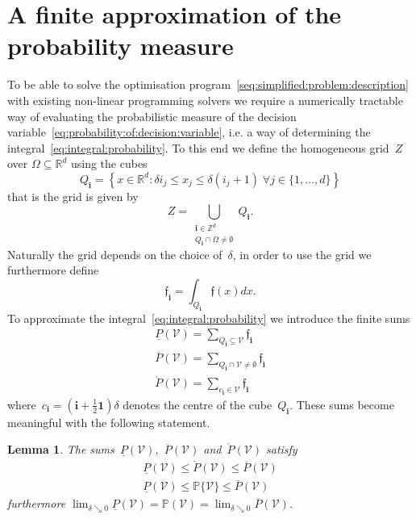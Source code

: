 \documentclass[letterpaper, 10pt, conference]{ieeeconf} %
\newtheorem{thm}{Lemma}[section]
\providecommand{\bfa}[1]{\mathbf{#1}}
\begin{document}
\section{A finite approximation of the probability measure}\label{sec:counting:cubes}
%
%
%
%
\noindent To be able to solve the optimisation program~\eqref{seq:simplified:problem:description} with existing non-linear programming solvers we require a numerically tractable way of evaluating the probabilistic measure of the decision variable~\eqref{eq:probability:of:decision:variable}, i.e. a way of determining the integral~\eqref{eq:integral:probability}.
%
To this end we define the homogeneous grid~$Z$ over $\Omega\subseteq\mathbb R^d$ using the cubes
%
\begin{equation}
	Q_{\bfa{i}} =\left\{x\in\mathbb R^d: \delta i_j \leq x_j\leq\delta (i_j+1)\;\forall j\in\{1,\dots,d\} \right\}
\end{equation}
%
that is the grid is given by
%
\begin{equation}
	Z = \bigcup_{\substack{\bfa{i}\in\mathbb Z^d\\ Q_\bfa{i}\cap\Omega\neq\emptyset}} Q_\bfa{i}.
\end{equation}
%
Naturally the grid depends on the choice of~$\delta$, in order to use the grid we furthermore define
%
\begin{equation}
	\mathfrak f_\bfa{i} = \int_{Q_\bfa{i}}\mathfrak f(x)dx.
\end{equation}
%
To approximate the integral~\eqref{eq:integral:probability} we introduce the finite sums
%
\begin{align}
\underline{P}(\mathcal V) = \sum_{Q_\bfa{i}\subseteq\mathcal V}\mathfrak f_\bfa{i}\label{eq:inner:approx}\\
\overline{P}(\mathcal V) = \sum_{Q_\bfa{i}\cap\mathcal V\neq\emptyset}\mathfrak f_\bfa{i} \label{eq:outer:approx}\\
\mathring{P}(\mathcal V) = \sum_{c_\bfa{i}\in\mathcal V}\mathfrak f_\bfa{i}\label{eq:center:approx}
\end{align}
%
where~$c_\bfa{i}=(\bfa{i}+\frac{1}{2}\bfa{1})\delta$ denotes the centre of the cube~$Q_\bfa{i}$.
%
These sums become meaningful with the following statement.
%
\begin{thm}\label{thm:sandwich:inequality}
The sums~$\underline P(\mathcal V)$,~$\overline{P}(\mathcal V)$ and~$\mathring{P}(\mathcal V)$ satisfy
%
\begin{align}
\underline{P}(\mathcal V)\leq \mathring{P}(\mathcal V)\leq\overline{P}(\mathcal V)\label{eq:sandwich:synthetical}\\
\underline{P}(\mathcal V)\leq \mathbb P\{\mathcal V\}\leq\overline{P}(\mathcal V)\label{eq:sandwich:analytical}
\end{align}
%
furthermore $\lim_{\delta\searrow0}\underline{P}(\mathcal V)=\mathbb{P}(\mathcal V)=\lim_{\delta\searrow0}\overline{P}(\mathcal V)$.
\end{thm}
\end{document}
